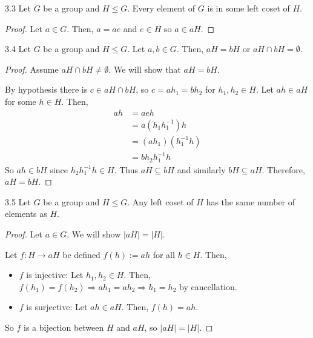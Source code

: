 \documentclass[12pt]{article}
\newcommand{\inv}{^{-1}}
\begin{document}
	\begin{mylem}{}{3.3}
		Let $G$ be a group and $H\leq G$. Every element of $G$ is in some left coset of $H$.
		\begin{proof}
			Let $a\in G$. Then, $a=ae$ and $e\in H$ so $a\in aH$.
		\end{proof}
	\end{mylem}
	
	\begin{mylem}{}{3.4}
		Let $G$ be a group and $H\leq G$. Let $a, b\in G$. Then, $aH=bH$ or $aH\cap bH=\emptyset$.
		\begin{proof}
			Assume $aH\cap bH\neq\emptyset$. We will show that $aH=bH$.
			
			By hypothesis there is $c\in aH\cap bH$, so $c=ah_1=bh_2$ for $h_1, h_2\in H$. Let $ah\in aH$ for some $h\in H$. Then,
			\begin{align*}
				ah&=aeh\\
				&=a(h_1h_1\inv)h\\
				&=(ah_1)(h_1\inv h)\\
				&=bh_2h_1\inv h
			\end{align*}
			So $ah\in bH$ since $h_2h_1\inv h\in H$. Thus $aH\subseteq bH$ and similarly $bH\subseteq aH$. Therefore, $aH=bH$.
		\end{proof}
	\end{mylem}
	
	\begin{mylem}{}{3.5}
		Let $G$ be a group and $H\leq G$. Any left coset of $H$ has the same number of elements as $H$.
		\begin{proof}
			Let $a\in G$. We will show $|aH|=|H|$.
			
			Let $f:H\to aH$ be defined $f(h):=ah$ for all $h\in H$. Then,
			\begin{itemize}
				\item $f$ is injective: Let $h_1, h_2\in H$. Then, $f(h_1)=f(h_2)\Longrightarrow ah_1=ah_2\Longrightarrow h_1=h_2$ by cancellation.
				\item $f$ is surjective: Let $ah\in aH$. Then, $f(h)=ah$.
			\end{itemize}
			So $f$ is a bijection between $H$ and $aH$, so $|aH|=|H|$.
		\end{proof}		
	\end{mylem}
	
\end{document}
